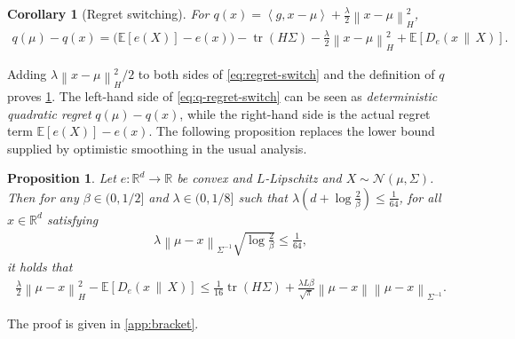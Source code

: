 \documentclass[11pt]{article}
\newtheorem{proposition}[proposition]{Proposition}
\newtheorem{corollary}[corollary]{Corollary}
\newcommand{\R}{\mathbb R}
\newcommand{\E}{\mathbb E}
\newcommand{\N}{\mathcal N}
\newcommand{\tr}{\operatorname{tr}}
\newcommand{\1}{\mathbf 1}
\newcommand{\ip}[2]{\left\langle #1,#2\right\rangle}
\newcommand{\norm}[1]{\left\lVert #1\right\rVert}
\newcommand{\normm}[2]{\left\lVert #1\right\rVert_{#2}}
\begin{document}
\begin{corollary}[Regret switching]
    \label{cor:regret-switch}
    For
    $q(x)=\ip{g}{x-\mu}+\frac\lambda2\normm{x-\mu}{H}^2$,
    \begin{align}
        q(\mu) - q(x)
        =\bigl(\E[e(X)]-e(x)\bigr)
        -\tr(H\Sigma)
        -\frac\lambda2\normm{x-\mu}{H}^2
        +\E[D_e(x\,\|\,X)].
        \label{eq:q-regret-switch}
    \end{align}
\end{corollary}
Adding $\lambda\normm{x-\mu}{H}^2/2$ to both sides
of \eqref{eq:regret-switch} and the definition of $q$ proves \cref{cor:regret-switch}.
The left-hand side of \eqref{eq:q-regret-switch} can be seen as \textit{deterministic quadratic regret} $q(\mu) - q(x)$, while the right-hand side is the actual regret term $\E[e(X)]-e(x)$.
The following proposition replaces the lower bound supplied by optimistic
smoothing in the usual analysis.

\begin{proposition}
    \label{prop:bracket}
    Let
    $e:\R^d\to\R$ be convex and $L$-Lipschitz and $X\sim\N(\mu,\Sigma)$.
    Then for any $\beta\in(0,1/2]$ and $\lambda\in(0, 1/8]$
    such that $\lambda\left(d+\log\frac2\beta\right) \leq \frac{1}{64}$,
    for all $x\in\R^d$ satisfying
    \begin{align}
        \lambda\normm{\mu-x}{\Sigma^{-1}}
        \sqrt{\log\frac2\beta}                \leq \frac{1}{64},
        \label{eq:bracket-focus}
    \end{align}
    it holds that
    \begin{align}
        \frac\lambda2\normm{\mu-x}{H}^2
        -\E[D_e(x\,\|\,X)]
        \leq
        \frac1{16}\tr(H\Sigma)
        +\frac{\lambda L\beta}{\sqrt{\pi}}
        \norm{\mu-x}\normm{\mu-x}{\Sigma^{-1}}.
        \label{eq:bracket}
    \end{align}
\end{proposition}
The proof is given in \cref{app:bracket}.
\end{document}

